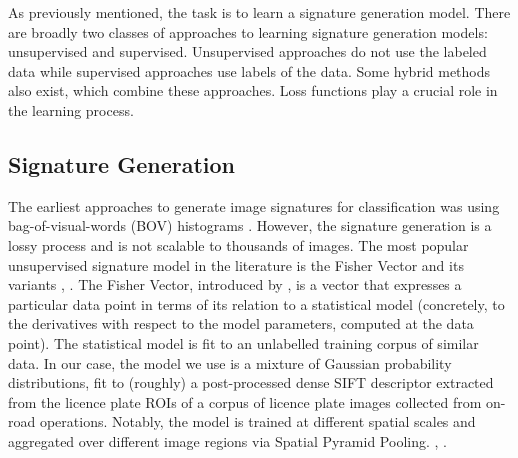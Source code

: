 \documentclass[10pt,twocolumn,letterpaper]{article}
\begin{document}
    \begin{comment}
    (SM: hmm.. but you wouldn't know that a plate has been seen before.. also, is there a better reference ? Unusual to make a patent a major reference.)  --- ECCV paper cited with the patent
    \end{comment}
    
    As previously mentioned, the task is to learn a signature generation model. There are broadly two classes of approaches to learning signature generation models: unsupervised and supervised. Unsupervised approaches do not use the labeled data while supervised approaches use labels of the data. Some hybrid methods also exist, which combine these approaches. Loss functions play a crucial role in the learning process.

    \subsection{Signature Generation \label{sec:related_work:sig_gen}}
        The earliest approaches to generate image signatures for classification was using bag-of-visual-words (BOV) histograms \cite{csurka2004visual}. However, the signature generation is a lossy process \cite{boiman2008defense} and is not scalable to thousands of images. The most popular unsupervised signature model in the literature is the Fisher Vector and its variants \cite{perronnin2007fisher}, \cite{perronnin2010improving}. The Fisher Vector, introduced by \cite{perronnin2007fisher}, is a vector that expresses a particular data point in terms of its relation to a statistical model (concretely, to the derivatives with respect to the model parameters, computed at the data point). The statistical model is fit to an unlabelled training corpus of similar data. In our case, the model we use is a mixture of Gaussian probability distributions, fit to (roughly) a post-processed dense SIFT descriptor \cite{lowe2004distinctive} extracted from the licence plate ROIs of a corpus of licence plate images collected from on-road operations. Notably, the model is trained at different spatial scales and aggregated over different image regions via Spatial Pyramid Pooling. \cite{perronnin2010improving}, \cite{lazebnik2006spatialpyr}.
        
\end{document}
